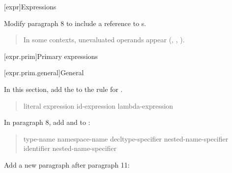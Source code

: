 

\setcounter{chapter}{4}
[expr]{Expressions}

Modify paragraph 8 to include a reference to s.

\begin{quote}
\pnum
In some contexts, unevaluated operands appear
(\added{\ref{expr.prim.req}, }, , 
).
\end{quote}

[expr.prim]{Primary expressions}

[expr.prim.general]{General}

In this section, add the
 to the rule for 
.

\begin{quote}
\begin{bnf}
\br
    literal\br
    \br
    \terminal{(} expression \terminal{)}\br
    id-expression\br
    lambda-expression\br
    \br
\end{bnf}
\end{quote}

In paragraph 8, add  and  
to :

\begin{quote}
\begin{bnf}
\br
    \terminal{::}\br
    type-name \terminal{::}\br
    namespace-name \terminal{::}\br
    decltype-specifier \terminal{::}\br
    \br
    \br
    nested-name-specifier identifier \terminal{::}\br
    nested-name-specifier \opt \terminal{::}
\end{bnf}
\end{quote}

Add a new paragraph after paragraph 11:

